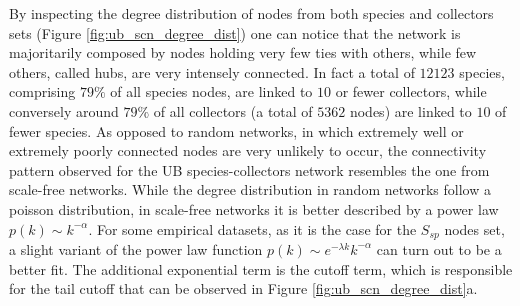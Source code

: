 By inspecting the degree distribution of nodes from both species and collectors sets (Figure \ref{fig:ub_scn_degree_dist}) one can notice that the network is majoritarily composed by nodes holding very few ties with others, while few others, called hubs, are very intensely connected. 
In fact a total of $12123$ species, comprising $79\%$ of all species nodes, are linked to $10$ or fewer collectors, while conversely around $79\%$ of all collectors (a total of $5362$ nodes) are linked to $10$ of fewer species. 
As opposed to random networks, in which extremely well or extremely poorly connected nodes are very unlikely to occur, the connectivity pattern observed for the UB species-collectors network resembles the one from scale-free networks. While the degree distribution in random networks follow a poisson distribution, in scale-free networks it is better described by a power law $ p(k) \sim k^{-\alpha} $. For some empirical datasets, as it is the case for the $S_{sp}$ nodes set, a slight variant of the power law function $p(k) \sim e^{-\lambda k} k^{-\alpha}$ can turn out to be a better fit. The additional exponential term is the cutoff term, which is responsible for the tail cutoff that can be observed in Figure \ref{fig:ub_scn_degree_dist}a. 

